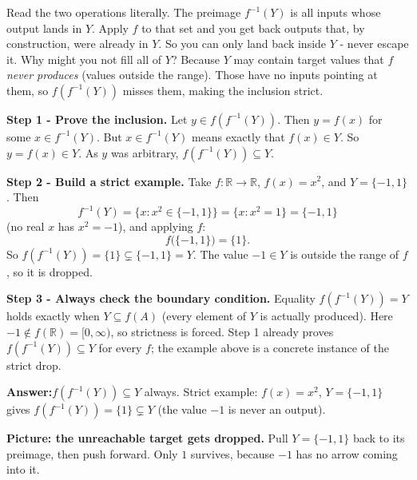 \documentclass[11pt,a4paper]{article}
\newcommand{\R}{\mathbb{R}}
\newcommand{\answer}[1]{\begin{answerbox}\centering\textbf{Answer:}\quad #1\end{answerbox}}
\begin{document}
\begin{ideabox}
Read the two operations literally. The preimage $f^{-1}(Y)$ is \textquotedbl{}all inputs whose
output lands in $Y$.\textquotedbl{} Apply $f$ to that set and you get back outputs that, by
construction, were already in $Y$. So you can only land back inside $Y$ - never escape it. Why
might you not fill all of $Y$? Because $Y$ may contain target values that $f$ \emph{never produces}
(values outside the range). Those have no inputs pointing at them, so $f(f^{-1}(Y))$ misses them,
making the inclusion strict.
\end{ideabox}

\textbf{Step 1 - Prove the inclusion.} Let $y\in f(f^{-1}(Y))$. Then $y=f(x)$ for some
$x\in f^{-1}(Y)$. But $x\in f^{-1}(Y)$ means exactly that $f(x)\in Y$. So $y=f(x)\in Y$. As $y$ was
arbitrary, $f(f^{-1}(Y))\subseteq Y$.

\textbf{Step 2 - Build a strict example.} Take $f:\R\to\R$, $f(x)=x^2$, and $Y=\{-1,1\}$. Then
\[
f^{-1}(Y)=\{x:x^2\in\{-1,1\}\}=\{x:x^2=1\}=\{-1,1\}
\]
(no real $x$ has $x^2=-1$), and applying $f$:
\[
f\bigl(\{-1,1\}\bigr)=\{1\}.
\]
So $f(f^{-1}(Y))=\{1\}\subsetneq\{-1,1\}=Y$. The value $-1\in Y$ is outside the range of $f$, so it
is dropped.

\textbf{Step 3 - Always check the boundary condition.} Equality $f(f^{-1}(Y))=Y$ holds exactly when
$Y\subseteq f(A)$ (every element of $Y$ is actually produced). Here $-1\notin f(\R)=[0,\infty)$, so
strictness is forced. Step 1 already proves $f(f^{-1}(Y))\subseteq Y$ for every $f$; the example
above is a concrete instance of the strict drop.

\answer{$f(f^{-1}(Y))\subseteq Y$ always. Strict example: $f(x)=x^2$, $Y=\{-1,1\}$ gives
$f(f^{-1}(Y))=\{1\}\subsetneq Y$ (the value $-1$ is never an output).}

\medskip
\textbf{Picture: the unreachable target gets dropped.} Pull $Y=\{-1,1\}$ back to its preimage, then
push forward. Only $1$ survives, because $-1$ has no arrow coming into it.

\begin{center}
\end{center}
\end{document}

